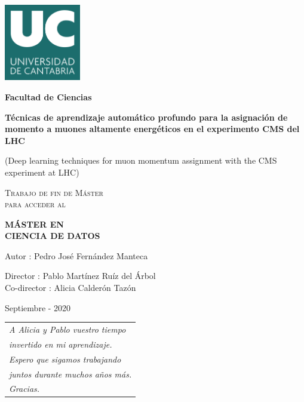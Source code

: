\documentclass[a4paper,12pt]{article}
\begin{document}
\begin{titlepage}
\centering
\includegraphics[width=0.25\textwidth]{figures/logo_UC.jpg} 
\par 
\vspace{1cm}
{\LARGE \textbf{Facultad de Ciencias} \par}
\vspace{1.5cm}
{\LARGE\bfseries T\'ecnicas de aprendizaje autom\'atico profundo para la asignaci\'on de momento a muones altamente energ\'eticos en el experimento CMS del LHC}
\vspace{0.6cm}
\\
{\LARGE (Deep learning techniques for muon momentum assignment with the CMS experiment at LHC) \par}
\vspace{2.6cm}
{\scshape\large Trabajo de fin de M\'aster \\ para acceder al \par}
\vspace{0.3cm}
{\scshape\Large \textbf{M\'ASTER EN \\ CIENCIA DE DATOS} \par}
\begin{flushright}
\vspace{2.6cm}
{\large Autor : Pedro Jos\'e Fern\'andez Manteca \par}
{\large Director : Pablo Mart\'inez Ru\'iz del \'Arbol\\}
{\large Co-director : Alicia Calder\'on Taz\'on\\}
\vspace{0.5cm}
{\large Septiembre - 2020\par}
\vfill
\end{flushright}
\end{titlepage}


\newpage

\null\hfill\begin{tabular}[t]{l@{}}
  \textit{A Alicia y Pablo vuestro tiempo} \\
  \textit{invertido en mi aprendizaje.} \\
  \textit{Espero que sigamos trabajando} \\
  \textit{juntos durante muchos a\~nos m\'as.} \\
  \textit{Gracias.} \\
\end{tabular}
\end{document}
